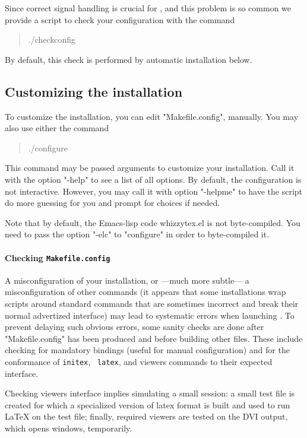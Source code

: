 \documentclass[12pt]{article}
\begin{document}
Since correct signal handling is crucial for {\whizzy}, and this problem
is so common we provide a script to check your configuration with the command
\begin{quote}
\begin{tt}
./checkconfig
\end{tt}
\end{quote}
By default, this check is performed by automatic installation below.

\subsection {Customizing the installation}
\label {customizing}

To customize the installation, you can edit
\lst"Makefile.config", manually.
You may also use either the command
\begin{quote}
\begin{tt}
./configure
\end{tt}
\end{quote}
This command may be passed arguments to customize your installation.
Call it with the option \lst"-help" to see a list of all options.
%
By default, the configuration is not interactive.  However, you may call it
with option \lst"-helpme" to have the script do more guessing for you and
prompt for choices if needed.

Note that by default, the Emacs-lisp code whizzytex.el is not
byte-compiled. You need to pass the option \lst"-elc" to \lst"configure" in
order to byte-compiled it.

\paragraph {Checking {\tt Makefile.config}}

A misconfiguration of your installation, or ---much more subtle--- a
misconfiguration of other commands (it appears that some installations wrap
scripts around standard commands that are sometimes incorrect and break
their normal advertized interface) may lead to systematic errors when
launching {\whizzy}. To prevent delaying such obvious errors, some sanity
checks are done after \lst"Makefile.config" has been produced and before
building other files.  These include checking for mandatory bindings (useful
for manual configuration) and for the conformance of {\tt initex}, {\tt
latex}, and viewers commands to their expected interface.

Checking viewers interface implies simulating a small {\whizzy} session: a
small test file is created for which a specialized version of latex format
is built and used to run {\LaTeX} on the test file; finally, required
viewers are tested on the DVI output, which opens windows, temporarily.
\end{document}
